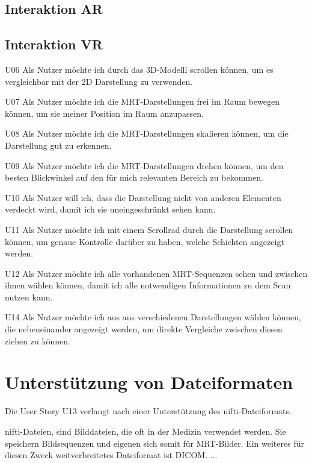 
\subsection{Interaktion AR}

\subsection{Interaktion VR}

U06  Als Nutzer möchte ich durch das 3D-Modelll scrollen können, um es vergleichbar mit der 2D Darstellung zu verwenden.

U07  Als Nutzer möchte ich die MRT-Darstellungen frei im Raum bewegen können, um sie meiner Position im Raum anzupassen.

U08 Als Nutzer möchte ich die MRT-Darstellungen skalieren können, um die Darstellung gut zu erkennen.

U09  Als Nutzer möchte ich die MRT-Darstellungen drehen können, um den besten Blickwinkel auf den für mich relevanten Bereich zu bekommen. 

U10  Als Nutzer will ich, dass die Darstellung nicht von anderen Elementen verdeckt wird, damit ich sie uneingeschränkt sehen kann. 

U11  Als Nutzer möchte ich mit einem Scrollrad durch die Darstellung scrollen können, um genaue Kontrolle darüber zu haben, welche Schichten angezeigt werden.

U12  Als Nutzer möchte ich alle vorhandenen MRT-Sequenzen sehen und zwischen ihnen wählen können, damit ich alle notwendigen Informationen zu dem Scan nutzen kann.  

U14  Als Nutzer möchte ich aus aus verschiedenen Darstellungen wählen können, die nebeneinander angezeigt werden, um direkte Vergleiche zwischen diesen ziehen zu können.


\section{Unterstützung von Dateiformaten} 

Die User Story U13 verlangt nach einer Unterstützung des nifti-Dateiformats.

nifti-Dateien, sind Bilddateien, die oft in der Medizin verwendet werden. Sie speichern Bildsequenzen und eigenen sich somit für MRT-Bilder. 
Ein weiteres für diesen Zweck weitverbreitetes Dateiformat ist DICOM. ...

